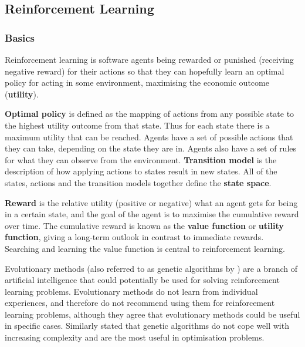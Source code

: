 \subsection{Reinforcement Learning}
\label{sec:literature:ai}


\subsubsection{Basics}
\label{sec:literature:ai:basics}

Reinforcement learning is software agents being rewarded or punished
(receiving negative reward) for their actions so that they can hopefully learn
an optimal policy for acting in some environment, maximising the economic
outcome (\textbf{utility}).

\textbf{Optimal policy} is defined as the mapping of actions from any possible
state to the highest utility outcome from that state. Thus for each state there
is a maximum utility that can be reached. Agents have a set of possible actions
that they can take, depending on the state they are in. Agents also have a set
of rules for what they can observe from the environment. \textbf{Transition
model} is the description of how applying actions to states result in new
states. All of the states, actions and the transition models together define
the \textbf{state space}. \parencite{Russell2010ai+modern,
Sutton1998ai+reinforcement}

\textbf{Reward} is the relative utility (positive or negative) what an agent
gets for being in a certain state, and the goal of the agent is to maximise the
cumulative reward over time. The cumulative reward is known as the
\textbf{value function} or \textbf{utility function}, giving a long-term
outlook in contrast to immediate rewards. Searching and learning the value
function is central to reinforcement learning. \parencite{Russell2010ai+modern,
Sutton1998ai+reinforcement}

Evolutionary methods \parencite{Sutton1998ai+reinforcement} (also referred to
as genetic algorithms by \textcite{Russell2010ai+modern}) are a branch of
artificial intelligence that could potentially be used for solving
reinforcement learning problems. Evolutionary methods do not learn from
individual experiences, and therefore \textcite{Sutton1998ai+reinforcement} do
not recommend using them for reinforcement learning problems, although they
agree that evolutionary methods could be useful in specific cases. Similarly
\textcite{Russell2010ai+modern} stated that genetic algorithms do not cope well
with increasing complexity and are the most useful in optimisation problems.


